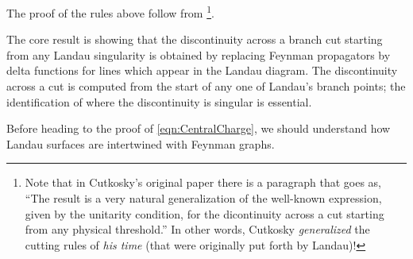 \documentclass[a4paper,11pt]{article}
\begin{document}
The proof of the rules above follow from \cite{Cutkosky:1960sp}\footnote{Note that in Cutkosky's original paper there is a paragraph that goes as, ``The result is a very natural generalization of the well-known expression, given by the unitarity condition, for the dicontinuity across a cut starting from any physical threshold.'' In other words, Cutkosky \textit{generalized} the cutting rules of \textit{his time} (that were originally put forth by Landau)!}. 

The core result is showing that the discontinuity across a branch cut starting from any Landau singularity is obtained by replacing Feynman propagators by delta functions for lines which appear in the Landau diagram. The discontinuity across a cut is computed from the start of any one of Landau's branch points; the identification of where the discontinuity is singular is essential. 

Before heading to the proof of \eqref{eqn:CentralCharge}, we should understand how Landau surfaces are intertwined with Feynman graphs. 
\end{document}
